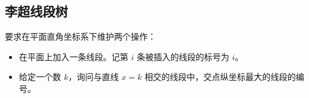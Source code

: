 \subsection{李超线段树}

要求在平面直角坐标系下维护两个操作：

\begin{itemize}
    \item 在平面上加入一条线段。记第 $i$ 条被插入的线段的标号为 $i$。
    \item 给定一个数 $k$，询问与直线 $x = k$ 相交的线段中，交点纵坐标最大的线段的编号。
\end{itemize}

